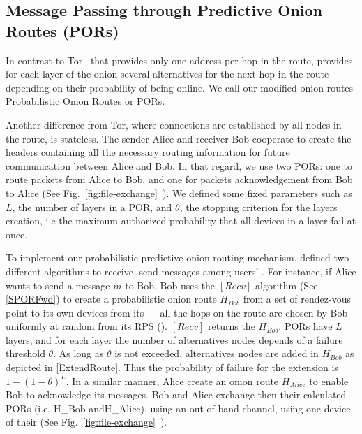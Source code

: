 
\subsection{Message Passing through Predictive Onion Routes (PORs)}
\label{sec:message_passing}


In contrast to Tor~\cite{Tor} that provides only one address per hop
in the route, \name provides for each layer of the onion several
alternatives for the next hop in the route depending on their
probability of being online. We call our modified onion routes
Probabilistic Onion Routes or PORs.

Another difference from Tor, where connections are established by all
nodes in the route, \name is stateless. The sender
Alice and receiver Bob cooperate to create the headers containing all
the necessary routing information for future communication between
Alice and Bob. In that regard, we use two PORs: one to route packets from Alice to
Bob, and one for packets acknowledgement from Bob to Alice (See
Fig.~\ref{fig:file-exchange}~). We defined some fixed
parameters such as $L$, the number of layers in a POR, and
$\theta$, the stopping criterion for the layers creation, i.e the
maximum authorized  probability that all devices in a layer fail at
once.

To implement our  probabilistic
predictive onion routing mechanism, \name defined two different algorithms to
receive, send messages among users' \squad. For instance,
if Alice wants to send a message \(m\) to Bob, Bob uses the
\([Recv]\) algorithm (See \cref{SPORFwd}) to create a probabilistic onion route \(H_{Bob}\) from
 a set of rendez-vous point to its own devices from its \squad --- all the hops on the route are 
chosen by Bob uniformly at random from its RPS (\view).
 \([Recv]\) returns the \(H_{Bob}\).
PORs have \(L\) layers, and for each layer the number of
alternatives nodes depends of a failure threshold \(\theta\). 
As long as \(\theta\) is not exceeded, alternatives nodes are added in
\(H_{Bob}\) as depicted in \cref{ExtendRoute}. Thus the probability of
failure for the extension is \(1 - (1 - \theta)^L\). In a similar
manner, Alice create an onion route \(H_{Alice}\) to enable Bob to
acknowledge its messages. Bob and Alice exchange then their calculated
PORs (i.e. H_{Bob} andH_{Alice}), using an
out-of-band channel, \eg using one device of their \squad (See
Fig.~\ref{fig:file-exchange}~).

